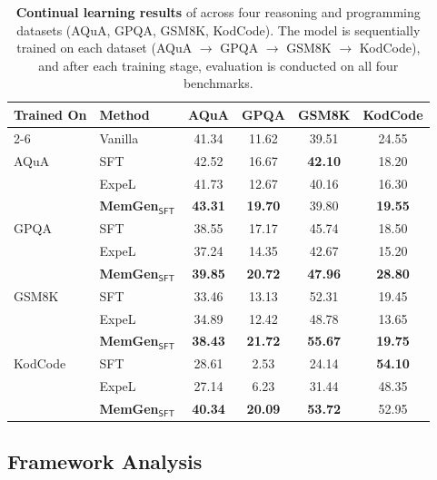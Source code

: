 \documentclass[]{fairmeta}
\newcommand{\ourmethod}{{\fontfamily{lmtt}\selectfont \textbf{MemGen}}\xspace}
\newcommand{\llmname}[1]{{\fontfamily{pcr}\selectfont {#1}}\xspace}
\begin{document}
\begin{table}[!h]
\centering 
\caption{\textbf{Continual learning results} of \llmname{Qwen2.5-1.5B-Instruct} across four reasoning and programming datasets (AQuA, GPQA, GSM8K, KodCode). The model is sequentially trained on each dataset (AQuA $\rightarrow$ GPQA $\rightarrow$ GSM8K $\rightarrow$ KodCode), and after each training stage, evaluation is conducted on all four benchmarks.}
\label{tab:continual}
\small
\setlength{\tabcolsep}{8pt}
\renewcommand{\arraystretch}{1.3}
\begin{tabular}{llcccc}
\toprule
\multirow{2}{*}{\textbf{Trained On}} & \textbf{Method} & AQuA & GPQA & GSM8K & KodCode \\
\cmidrule{2-6}
 & Vanilla & 41.34 & 11.62 & 39.51 & 24.55 \\
\midrule
AQuA & SFT    & 42.52 & 16.67 & \textbf{42.10} & 18.20 \\
     & ExpeL  &  41.73     &  12.67   &   40.16    &   16.30    \\
     & \ourmethod$_\mathsf{SFT}$ & \textbf{43.31} & \textbf{19.70} & 39.80 & \textbf{19.55} \\
\midrule
GPQA & SFT    & 38.55 & 17.17 & 45.74 & 18.50 \\
     & ExpeL  &  37.24   &  14.35     &    42.67   &   15.20    \\
     & \ourmethod$_\mathsf{SFT}$ & \textbf{39.85} & \textbf{20.72} & \textbf{47.96} & \textbf{28.80} \\
\midrule
GSM8K & SFT    & 33.46 & 13.13 & 52.31 & 19.45 \\
      & ExpeL  & 34.89    & 12.42    & 48.78    & 13.65    \\
      & \ourmethod$_\mathsf{SFT}$ & \textbf{38.43} & \textbf{21.72} & \textbf{55.67} & \textbf{19.75} \\
\midrule
KodCode & SFT    & 28.61 & 2.53 & 24.14 & \textbf{54.10} \\
        & ExpeL  & 27.14  &  6.23  &  {31.44}  &   48.35 \\
        & \ourmethod$_\mathsf{SFT}$ & \textbf{40.34} & \textbf{20.09} & \textbf{53.72} & 52.95 \\
\bottomrule
\end{tabular}
\end{table}



\vspace{3em}
\subsection{Framework Analysis}\label{app:analysis}
\end{document}
